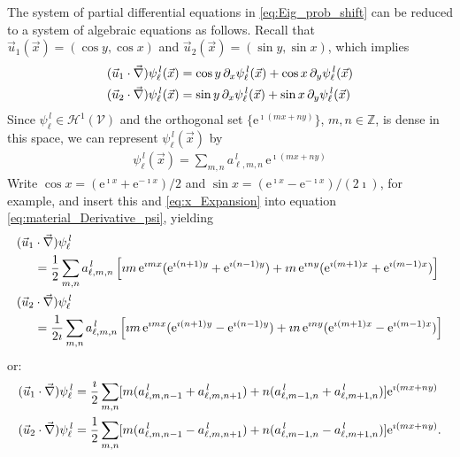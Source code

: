\documentclass{article}
\newcommand{\e}{\mathrm{e}}
\newcommand{\Hc}{\mathcal{H}}
\newcommand{\Vc}{\mathcal{V}}
\newcommand{\0}{\mathbf{0}}
\newcommand{\1}{\mathbf{1}}
\newcommand{\2}{\mathbf{2}}
\newcommand{\3}{\mathbf{3}}
\newcommand{\4}{\mathbf{4}}
\newcommand{\5}{\mathbf{5}}
\newcommand{\6}{\mathbf{6}}
\newcommand{\7}{\mathbf{7}}
\newcommand{\8}{\mathbf{8}}
\begin{document}
The system of partial differential equations in
\eqref{eq:Eig_prob_shift} can be reduced to a system of algebraic
equations as follows. Recall that
$\vec{u}_1(\vec{x})=(\cos{y},\cos{x})$ and
$\vec{u}_2(\vec{x})=(\sin{y},\sin{x})$, which implies 
%
\begin{align}\label{eq:material_Derivative_psi}
  (\vec{u}_1\cdot\vec{\nabla})\psi_\ell^{\,l}(\vec{x})
          &=\cos{y}\,\partial_x\psi_\ell^{\,l}(\vec{x})+\cos{x}\,\partial_y\psi_\ell^{\,l}(\vec{x})\\
  (\vec{u}_2\cdot\vec{\nabla})\psi_\ell^{\,l}(\vec{x})
          &=\sin{y}\,\partial_x\psi_\ell^{\,l}(\vec{x})+\sin{x}\,\partial_y\psi_\ell^{\,l}(\vec{x})\notag
\end{align}
%
Since $\psi_\ell^{\,l}\in\Hc^1(\Vc)$ and the orthogonal set $\{\e^{\imath (mx+ny)}\}$,
$m,n\in\mathbb{Z}$, is dense in this space, we can represent
$\psi_\ell^{\,l}(\vec{x})$ by
%
\begin{align}\label{eq:x_Expansion}
  \psi_\ell^{\,l}(\vec{x})=\sum_{m,n}a^{\,l}_{\ell,m,n}\,\e^{\imath (mx+ny)}
\end{align}
%
Write $\cos{x}=(\e^{\imath x}+\e^{-\imath x})/2$ and
$\sin{x}=(\e^{\imath x}-\e^{-\imath x})/(2\imath)$, for example, and insert this
and \eqref{eq:x_Expansion} into equation
\eqref{eq:material_Derivative_psi}, yielding
%
\begin{align}
  (\vec{u}_1&\cdot\vec{\nabla})\psi_\ell^{\,l}\\
    &=\frac{1}{2}\sum_{m,n}a^{\,l}_{\ell,m,n}\left[
        \imath m\,\e^{\imath mx}(\e^{\imath(n+1)y}+\e^{\imath(n-1)y})
        +\imath n\,\e^{\imath ny}(\e^{\imath(m+1)x}+\e^{\imath(m-1)x})
                       \right]
    \notag\\
%    
  (\vec{u}_2&\cdot\vec{\nabla})\psi_\ell^{\,l}\notag\\
    &=\frac{1}{2\imath}\sum_{m,n}a^{\,l}_{\ell,m,n}\left[
        \imath m\,\e^{\imath mx}(\e^{\imath(n+1)y}-\e^{\imath(n-1)y})
        +\imath n\,\e^{\imath ny}(\e^{\imath(m+1)x}-\e^{\imath(m-1)x})
                       \right]
                       \notag
\end{align}
%
or:
%
\begin{align}\label{eq:Algebraic_advection}
  (\vec{u}_1\cdot\vec{\nabla})\psi_\ell^{\,l}
    &=\frac{\imath}{2}\sum_{m,n}
    [m(a^{\,l}_{\ell,m,n-1}+a^{\,l}_{\ell,m,n+1})+n(a^{\,l}_{\ell,m-1,n}+a^{\,l}_{\ell,m+1,n})]\e^{\imath (mx+ny)}
   \notag\\
  (\vec{u}_2\cdot\vec{\nabla})\psi_\ell^{\,l}
    &=\frac{1}{2}\sum_{m,n}
    [m(a^{\,l}_{\ell,m,n-1}-a^{\,l}_{\ell,m,n+1})+n(a^{\,l}_{\ell,m-1,n}-a^{\,l}_{\ell,m+1,n})]\e^{\imath (mx+ny)} .
\end{align}
\end{document}
